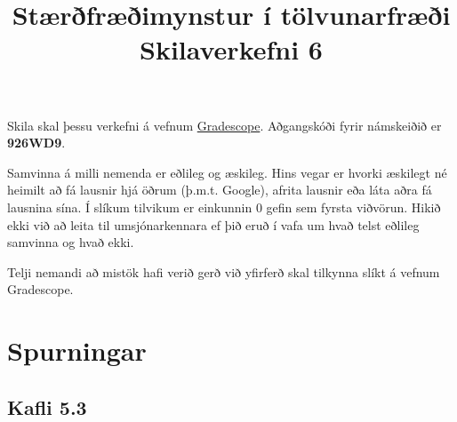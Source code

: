 \documentclass{exam}
\title{Stærðfræðimynstur í tölvunarfræði \\ Skilaverkefni 6}
\author{}
\begin{document}
\maketitle
\thispagestyle{empty} 

Skila skal þessu verkefni á vefnum \href{https://gradescope.com/}{Gradescope}. Aðgangskóði fyrir námskeiðið er \textbf{926WD9}.

Samvinna á milli nemenda er eðlileg og æskileg. Hins vegar er hvorki æskilegt né heimilt að fá lausnir hjá öðrum (þ.m.t. Google), afrita lausnir eða láta aðra fá lausnina sína. Í slíkum tilvikum er einkunnin 0 gefin sem fyrsta viðvörun. Hikið ekki við að leita til umsjónarkennara ef þið eruð í vafa um hvað telst eðlileg samvinna og hvað ekki.

Telji nemandi að mistök hafi verið gerð við yfirferð skal tilkynna slíkt á vefnum Gradescope.

\section{Spurningar}

\subsection{Kafli 5.3}
\end{document}
